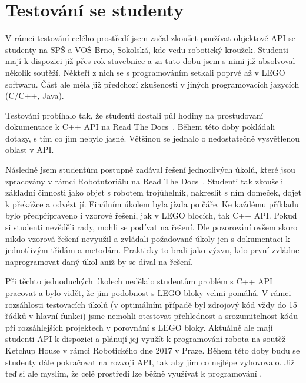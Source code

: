 \section{Testování se studenty}

V rámci testování celého prostředí jsem začal zkoušet používat objektové API se studenty na SPŠ a VOŠ Brno, Sokolská, kde vedu robotický kroužek.
Studenti mají k dispozici již přes rok stavebnice \legoEV{} a za tuto dobu jsem s nimi již absolvoval několik soutěží. 
Někteří z nich se s programováním setkali poprvé až v LEGO softwaru.
Část ale měla již předchozí zkušenosti v jiných programovacích jazycích (C/C++, Java).

Testování probíhalo tak, že studenti dostali půl hodiny na prostudovaní dokumentace k C++ API na Read The Docs~\cite{readthedocs}. 
Během této doby pokládali dotazy, s tím co jim nebylo jasné. 
Většinou se jednalo o nedostatečně vysvětlenou oblast v API. 

Následně jsem studentům postupně zadával řešení jednotlivých úkolů, které jsou zpracovány v rámci Robotutoriálu  na Read The Docs~\cite{readthedocs}.
Studenti tak zkoušeli základní činnosti jako objet s robotem trojúhelník, nakreslit s ním domeček, dojet k překážce  a odvézt jí. 
Finálním úkolem byla jízda po čáře.
Ke každému příkladu bylo předpřipraveno i vzorové řešení, jak v LEGO blocích, tak C++ API.
Pokud si studenti nevěděli rady, mohli se podívat na řešení. 
Dle pozorování ovšem skoro nikdo vzorová řešení nevyužil a zvládali požadované úkoly jen s dokumentaci k jednotlivým třídám a metodám.
Prakticky to brali jako výzvu, kdo první zvládne naprogramovat daný úkol aniž by se díval na řešení.

Při těchto jednoduchých úkolech nedělalo studentům problém s C++ API pracovat a bylo vidět, že jim podobnost s LEGO bloky velmi pomáhá.
V rámci rozsáhlosti testovacích úkolů (v optimálním případě byl zdrojový kód vždy do 15 řádků v hlavní funkci) jsme nemohli otestovat přehlednost a srozumitelnost kódu při rozsáhlejších projektech v porovnání s LEGO bloky.
Aktuálně ale mají studenti API k dispozici a plánují jej využít k programování robota na soutěž Ketchup House v rámci Robotického dne 2017 v Praze.
Během této doby budu se studenty dále pokračovat na rozvoji API, tak aby jim co nejlépe vyhovovalo.
Již teď si ale myslím, že celé prostředí lze běžně využívat k programování \legoEV{}.
